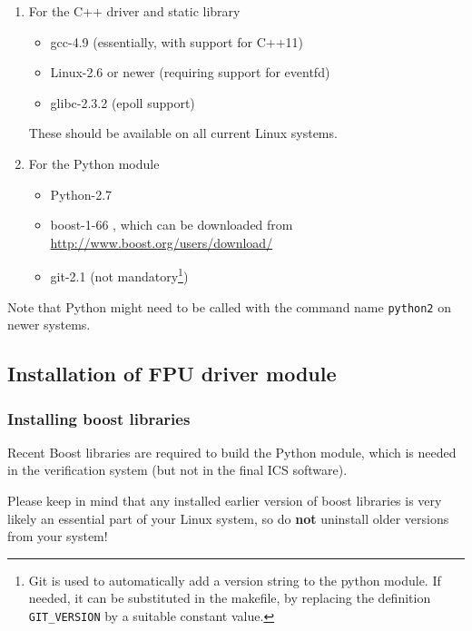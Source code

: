 \documentclass{scrartcl}[12pt,a4paper]
\begin{document}
\begin{enumerate}
  \item For the C++ driver and static library

    
\begin{itemize}
\item gcc-4.9 (essentially, with support for C++11)
\item Linux-2.6 or newer (requiring support for eventfd)
\item glibc-2.3.2 (epoll support)
\end{itemize}

These should be available on all current Linux systems.

\item For the Python module

\begin{itemize}
\item Python-2.7
\item boost-1-66 , which can be downloaded from \url{http://www.boost.org/users/download/}
\item git-2.1 (not mandatory\footnote{Git is used to automatically add a version
  string to the python module. If needed, it can be substituted in the
  makefile, by replacing the definition \texttt{GIT\_VERSION} by a
  suitable constant value.})
\end{itemize}
\end{enumerate}


Note that Python might need to be called with the command name
\texttt{python2} on newer systems.

\subsection{Installation of FPU driver module}

\subsubsection{Installing boost libraries}

Recent Boost libraries are required to build the Python module, which
is needed in the verification system (but not in the final ICS
software).

Please keep in mind that any installed earlier version of boost
libraries is very likely an essential part of your Linux system, so do
\textbf{not} uninstall older versions from your system!
\end{document}
